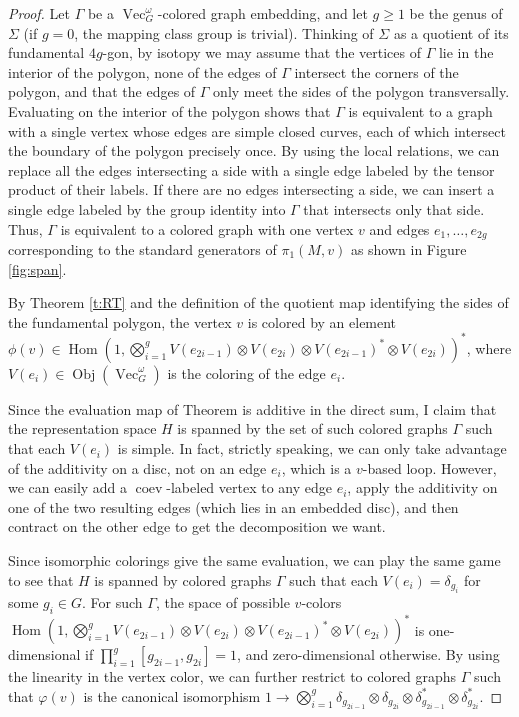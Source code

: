 \documentclass{amsart}
\DeclareMathOperator{\Vect}{Vec}
\DeclareMathOperator{\Hom}{Hom}
\DeclareMathOperator{\Obj}{Obj}
\DeclareMathOperator{\coev}{coev}
\newcommand{\one}{1}
\newcommand{\ph}{\varphi}
\newcommand{\Si}{\Sigma}
\begin{document}
\begin{proof}
Let $\Gamma$ be a $\Vect_G^\omega$-colored graph embedding, and let $g \ge 1$ be the genus of $\Si$ (if $g = 0$, the mapping class group is trivial). Thinking of $\Si$ as a quotient of its fundamental $4g$-gon, by isotopy we may assume that the vertices of $\Gamma$ lie in the interior of the polygon, none of the edges of $\Gamma$ intersect the corners of the polygon, and that the edges of $\Gamma$ only meet the sides of the polygon transversally.  Evaluating on the interior of the polygon shows that $\Gamma$ is equivalent to a graph with a single vertex whose edges are simple closed curves, each of which intersect the boundary of the polygon precisely once.  By using the local relations, we can replace all the edges intersecting a side with a single edge labeled by the tensor product of their labels.  If there are no edges intersecting a side, we can insert a single edge labeled by the group identity into $\Gamma$ that intersects only that side.  Thus, $\Gamma$ is equivalent to a colored graph with one vertex $v$ and edges $e_1, \ldots, e_{2g}$ corresponding to the standard generators of $\pi_1(M,v)$ as shown in Figure \ref{fig:span}.

By Theorem \ref{t:RT} and the definition of the quotient map identifying the sides of the fundamental polygon, the vertex $v$ is colored by an element $\phi(v) \in \Hom (\one, \bigotimes_{i=1}^g V(e_{2i-1}) \otimes V(e_{2i})  \otimes V(e_{2i-1})^* \otimes V(e_{2i}))^*$, where $V(e_i) \in \Obj(\Vect_G^\omega)$ is the coloring of the edge $e_i$.   

Since the evaluation map of Theorem \label{t:RT} is additive in the direct sum, I claim that the representation space $H$ is spanned by the set of such colored graphs $\Gamma$ such that each $V(e_i)$ is simple.   In fact, strictly speaking, we can only take advantage of the additivity on a disc, not on an edge $e_i$, which is a $v$-based loop. However, we can easily add a $\coev$-labeled vertex to any edge $e_i$, apply the additivity on one of the two resulting edges (which lies in an embedded disc), and then contract on the other edge to get the decomposition we want.

Since isomorphic colorings give the same evaluation, we can play the same game to see that $H$ is spanned by colored graphs $\Gamma$ such that
each $V(e_i) = \delta_{g_i}$ for some $g_i \in G$.  For such $\Gamma$,  the space of possible $v$-colors $\Hom (\one, \bigotimes_{i=1}^g V(e_{2i-1}) \otimes V(e_{2i})  \otimes V(e_{2i-1})^* \otimes V(e_{2i}))^*$ is one-dimensional if $\prod_{i=1}^g [g_{2i-1}, g_{2i}] = 1$, and zero-dimensional otherwise.
By using the linearity in the vertex color, we can further restrict to colored graphs $\Gamma$ such that $\ph(v)$ is the canonical isomorphism $\one \to \bigotimes_{i=1}^g \delta_{g_{2i-1}} \otimes \delta_{g_{2i}} \otimes \delta_{g_{2i-1}}^* \otimes \delta_{g_{2i}}^*$. 


\end{proof}
\end{document}

